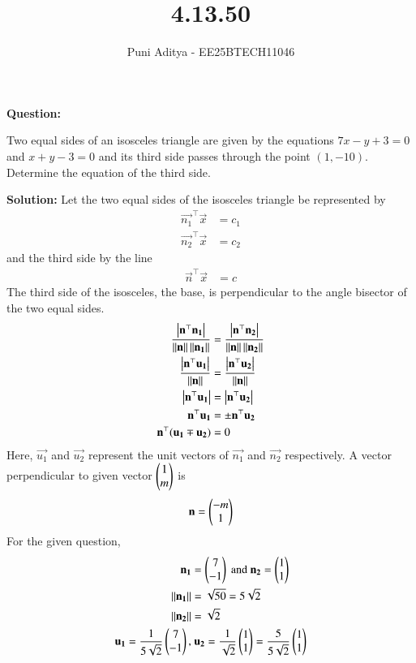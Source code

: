 \documentclass[journal]{IEEEtran}
\begin{document}
\title{4.13.50}
\author{Puni Aditya - EE25BTECH11046}
\maketitle

\textbf{Question:}

Two equal sides of an isosceles triangle are given by the equations $7x - y + 3 = 0$ and $x + y - 3 = 0$ and its third side passes through the point $(1, -10)$. Determine the equation of the third side.

\textbf{Solution:}
Let the two equal sides of the isosceles triangle be represented by
\begin{align*}
    \vec{n_1}^\top\vec{x} &= c_1 \\
    \vec{n_2}^\top\vec{x} &= c_2
\end{align*}
and the third side by the line
\begin{align*}
    \vec{n}^\top\vec{x} &= c
\end{align*}
The third side of the isosceles, the base, is perpendicular to the angle bisector of the two equal sides.
\begin{align}
    \frac{\left\vert\mathbf{n}^\top\mathbf{n_1}\right\vert}{\left\lVert\mathbf{n}\right\rVert\left\lVert\mathbf{n_1}\right\rVert} &= \frac{\left\vert\mathbf{n}^\top\mathbf{n_2}\right\vert}{\left\lVert\mathbf{n}\right\rVert\left\lVert\mathbf{n_2}\right\rVert} \\
    \frac{\left\vert\mathbf{n}^\top\mathbf{u_1}\right\vert}{\left\lVert\mathbf{n}\right\rVert} &= \frac{\left\vert\mathbf{n}^\top\mathbf{u_2}\right\vert}{\left\lVert\mathbf{n}\right\rVert} \\
    \left\vert\mathbf{n}^\top\mathbf{u_1}\right\vert &= \left\vert\mathbf{n}^\top\mathbf{u_2}\right\vert \\
    \mathbf{n}^\top\mathbf{u_1} &= \pm \mathbf{n}^\top\mathbf{u_2} \\
    \mathbf{n}^\top(\mathbf{u_1} \mp \mathbf{u_2}) &= 0
\end{align}
Here, $\vec{u_1}$ and $\vec{u_2}$ represent the unit vectors of $\vec{n_1}$ and $\vec{n_2}$ respectively.
A vector perpendicular to given vector $\begin{pmatrix}1 \\ m\end{pmatrix}$ is
\begin{align}
    \mathbf{n} = \begin{pmatrix}-m \\ 1\end{pmatrix} \label{eq:40}
\end{align}
For the given question,
\begin{align}
    \mathbf{n_1} &= \begin{pmatrix}7 \\ -1\end{pmatrix}\text{ and }\mathbf{n_2} = \begin{pmatrix}1 \\ 1\end{pmatrix} \\
    \left\lVert\mathbf{n_1}\right\rVert &= \sqrt{50} = 5\sqrt{2} \\
    \left\lVert\mathbf{n_2}\right\rVert &= \sqrt{2} \\
    \mathbf{u_1} = \frac{1}{5\sqrt{2}}\begin{pmatrix}7 \\ -1\end{pmatrix},&\text{ }\mathbf{u_2} = \frac{1}{\sqrt{2}}\begin{pmatrix}1 \\ 1\end{pmatrix} = \frac{5}{5\sqrt{2}}\begin{pmatrix}1 \\ 1\end{pmatrix}
\end{align}
\end{document}

